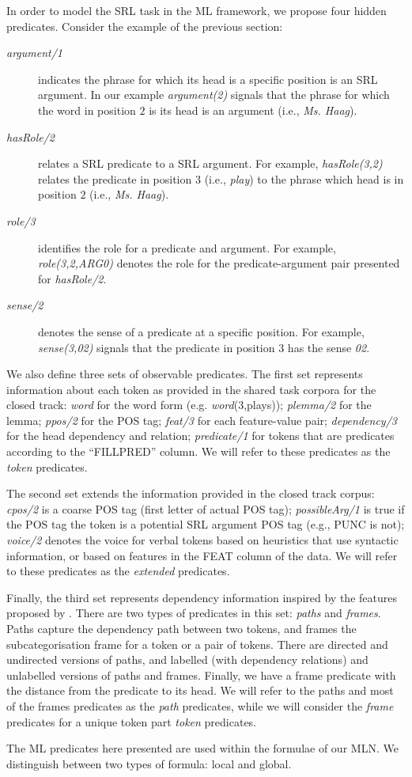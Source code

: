 
In order to model the SRL task in the ML framework, we propose four hidden 
predicates. Consider the example of the previous section:
\begin{description}
    \item [\emph{argument/1}] indicates the phrase for which its head is a 
        specific position is an SRL argument. In our example     
        \emph{argument(2)} signals that the phrase for which the word in 
        position $2$ is its head is an argument (i.e., \emph{Ms. Haag}).
    \item [\emph{hasRole/2}] relates a SRL predicate to a SRL argument. For example, \emph{hasRole(3,2)} relates the
        predicate in position $3$ (i.e., \emph{play}) to the phrase which head 
        is in position $2$ (i.e., \emph{Ms. Haag}).
    \item [\emph{role/3}] identifies the role for a predicate and argument. For example,
        \emph{role(3,2,ARG0)} denotes the role for the predicate-argument pair presented for \emph{hasRole/2}.
    \item [\emph{sense/2}] denotes the sense of a predicate at a
        specific position. For example, \emph{sense(3,02)}
        signals that the predicate in position $3$ has the sense \emph{02}.
\end{description}

We also define three sets of observable predicates. The first set represents 
information about each token as provided in the shared task corpora for the 
closed track:  \emph{word} for the word form (e.g. \emph{word}(3,plays)); 
\emph{plemma/2} for the lemma; \emph{ppos/2} for the POS tag; \emph{feat/3} for 
each feature-value pair; \emph{dependency/3} for the head dependency and 
relation; \emph{predicate/1} for tokens that are predicates according to the 
``FILLPRED'' column. We will refer to these predicates as the \emph{token} 
predicates. 

The second set extends the information provided in the closed track corpus: 
\emph{cpos/2} is a coarse POS tag (first letter of actual POS tag); \emph{possibleArg/1} is true if the POS tag the token is a potential SRL argument  POS tag (e.g., PUNC is not); \emph{voice/2} denotes the voice for verbal tokens based on heuristics that use
syntactic information, or based on features in the FEAT column of the data. We will 
refer to these predicates as the \emph{extended} predicates.

Finally, the third set represents dependency information inspired by the features proposed by \citet{xue04calibrating}. There are two types of 
predicates in this set: \emph{paths} and \emph{frames}.  Paths capture the 
dependency path between two tokens, and frames the subcategorisation frame for a 
token or a pair of tokens. There are directed and 
undirected versions of paths, and labelled  (with dependency relations) and unlabelled versions of paths and frames. Finally, we have a frame predicate with the distance from the 
predicate to its head.  We will refer to the paths and most of the frames 
predicates as the \emph{path} predicates, while we will consider the 
\emph{frame} predicates for a unique token part \emph{token} predicates.

The ML predicates here presented are used within the formulae of our MLN.  We 
distinguish between two types of formula: local and global. 
